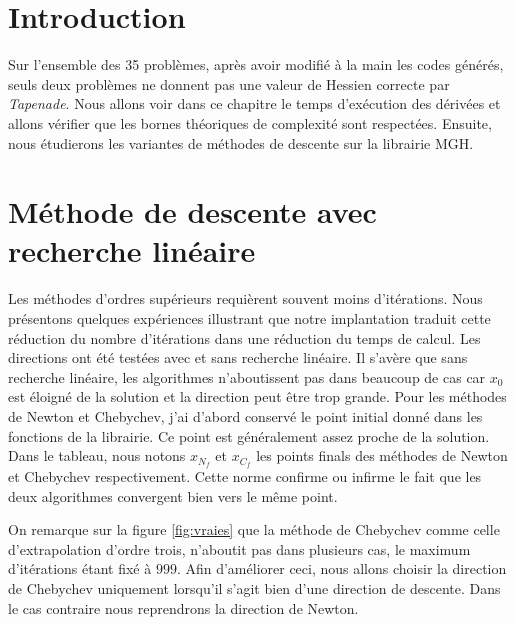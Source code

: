 



\section{Introduction}
Sur l'ensemble des 35 probl\`emes, apr\`es avoir modifi\'e \`a la main les codes g\'en\'er\'es, seuls deux probl\`emes ne donnent
pas une valeur de Hessien correcte par {\it Tapenade}. Nous allons voir dans ce chapitre le temps d'ex\'ecution 
des d\'eriv\'ees et allons v\'erifier que les bornes th\'eoriques de complexit\'e sont respect\'ees. 
Ensuite, nous \'etudierons les variantes de m\'ethodes de descente sur la librairie MGH.






\section{M\'ethode de descente avec recherche lin\'eaire}
Les m\'ethodes d'ordres sup\'erieurs requi\`erent souvent 
moins d'it\'erations. Nous pr\'esentons quelques exp\'eriences illustrant que notre implantation traduit cette r\'eduction du nombre
d'it\'erations dans une r\'eduction du temps de calcul. Les directions ont \'et\'e test\'ees avec et sans recherche lin\'eaire.
Il s'av\`ere que sans recherche lin\'eaire, les algorithmes n'aboutissent pas dans beaucoup de cas car $x_0$ est \'eloign\'e de la solution et
la direction peut être trop grande.
Pour les m\'ethodes de Newton et Chebychev, j'ai d'abord conserv\'e le point initial donn\'e dans les fonctions
de la librairie. Ce point est g\'en\'eralement assez proche de la solution. Dans le tableau, 
nous notons $x_{N_f}$ et $x_{C_f}$ les points finals des m\'ethodes de Newton et Chebychev respectivement. 
Cette norme confirme ou infirme le fait que les deux algorithmes convergent bien vers le même point.

On remarque sur la figure \ref{fig:vraies} que la m\'ethode de Chebychev comme celle d'extrapolation d'ordre trois,
 n'aboutit pas dans plusieurs cas, le maximum d'it\'erations \'etant fix\'e \`a $999$. Afin d'am\'eliorer ceci,
nous allons choisir la direction de Chebychev uniquement lorsqu'il s'agit bien d'une direction de descente.
 Dans le cas contraire nous reprendrons la direction de Newton.

